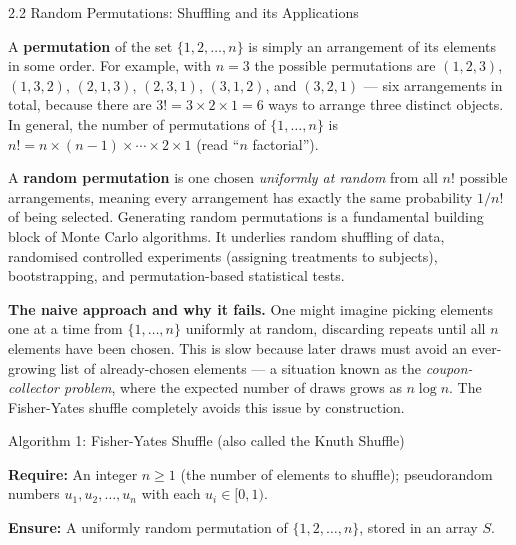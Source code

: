 \documentclass[aspectratio=169,10pt]{beamer}
\begin{document}
\begin{frame}[allowframebreaks]{2.2 Random Permutations: Shuffling and its Applications}

A \textbf{permutation} of the set $\{1, 2, \ldots, n\}$ is simply an
arrangement of its elements in some order.  For example, with $n=3$ the
possible permutations are $(1,2,3)$, $(1,3,2)$, $(2,1,3)$, $(2,3,1)$,
$(3,1,2)$, and $(3,2,1)$ --- six arrangements in total, because there are
$3! = 3 \times 2 \times 1 = 6$ ways to arrange three distinct objects.
In general, the number of permutations of $\{1,\ldots,n\}$ is
$n! = n \times (n-1) \times \cdots \times 2 \times 1$ (read ``$n$ factorial'').

A \textbf{random permutation} is one chosen \emph{uniformly at random} from
all $n!$ possible arrangements, meaning every arrangement has exactly the same
probability $1/n!$ of being selected.  Generating random permutations is a
fundamental building block of Monte Carlo algorithms.  It underlies random
shuffling of data, randomised controlled experiments (assigning treatments
to subjects), bootstrapping, and permutation-based statistical tests.

\medskip
\textbf{The naive approach and why it fails.}  One might imagine picking
elements one at a time from $\{1,\ldots,n\}$ uniformly at random, discarding
repeats until all $n$ elements have been chosen.  This is slow because later
draws must avoid an ever-growing list of already-chosen elements --- a
situation known as the \emph{coupon-collector problem}, where the expected
number of draws grows as $n \log n$.  The Fisher-Yates shuffle completely
avoids this issue by construction.

\begin{block}{Algorithm 1: Fisher-Yates Shuffle (also called the Knuth Shuffle)}

\textbf{Require:} An integer $n \ge 1$ (the number of elements to shuffle);
pseudorandom numbers $u_1, u_2, \ldots, u_n$ with each $u_i \in [0,1)$.

\textbf{Ensure:} A uniformly random permutation of $\{1, 2, \ldots, n\}$,
stored in an array $S$.


\end{block}
\end{frame}
\end{document}
